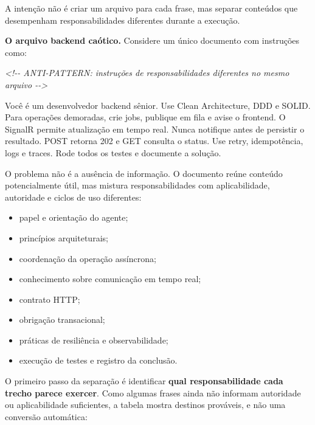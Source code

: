 \documentclass[
  10pt,
  a4paper,
  oneside]{book}
\newenvironment{Shaded}{}{}
\newcommand{\CommentTok}[1]{\textcolor[rgb]{0.38,0.63,0.69}{\textit{#1}}}
\newcommand{\NormalTok}[1]{#1}
\providecommand{\tightlist}{%
  \setlength{\itemsep}{0pt}\setlength{\parskip}{0pt}}
\renewenvironment{Shaded}{\begin{snugshade}}{\end{snugshade}}%
\begin{document}
A intenção não é criar um arquivo para cada frase, mas separar conteúdos
que desempenham responsabilidades diferentes durante a execução.

\textbf{O arquivo backend caótico.} Considere um único documento com
instruções como:

\begin{Shaded}
\begin{Highlighting}[]
\CommentTok{\textless{}!{-}{-} ANTI{-}PATTERN: instruções de responsabilidades diferentes no mesmo arquivo {-}{-}\textgreater{}}

\NormalTok{Você é um desenvolvedor backend sênior.}
\NormalTok{Use Clean Architecture, DDD e SOLID.}
\NormalTok{Para operações demoradas, crie jobs, publique em fila e avise o frontend.}
\NormalTok{O SignalR permite atualização em tempo real.}
\NormalTok{Nunca notifique antes de persistir o resultado.}
\NormalTok{POST retorna 202 e GET consulta o status.}
\NormalTok{Use retry, idempotência, logs e traces.}
\NormalTok{Rode todos os testes e documente a solução.}
\end{Highlighting}
\end{Shaded}

O problema não é a ausência de informação. O documento reúne conteúdo
potencialmente útil, mas mistura responsabilidades com aplicabilidade,
autoridade e ciclos de uso diferentes:

\begin{itemize}
\tightlist
\item
  papel e orientação do agente;
\item
  princípios arquiteturais;
\item
  coordenação da operação assíncrona;
\item
  conhecimento sobre comunicação em tempo real;
\item
  contrato HTTP;
\item
  obrigação transacional;
\item
  práticas de resiliência e observabilidade;
\item
  execução de testes e registro da conclusão.
\end{itemize}

O primeiro passo da separação é identificar \textbf{qual
responsabilidade cada trecho parece exercer}. Como algumas frases ainda
não informam autoridade ou aplicabilidade suficientes, a tabela mostra
destinos prováveis, e não uma conversão automática:
\end{document}
